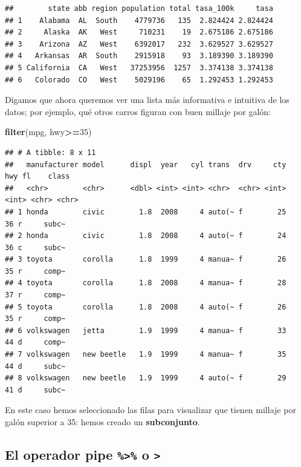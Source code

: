 \documentclass[
]{article}
\newenvironment{Shaded}{\begin{snugshade}}{\end{snugshade}}
\newcommand{\DecValTok}[1]{\textcolor[rgb]{0.00,0.00,0.81}{#1}}
\newcommand{\FunctionTok}[1]{\textcolor[rgb]{0.13,0.29,0.53}{\textbf{#1}}}
\newcommand{\NormalTok}[1]{#1}
\newcommand{\SpecialCharTok}[1]{\textcolor[rgb]{0.81,0.36,0.00}{\textbf{#1}}}
\begin{document}
\begin{verbatim}
##        state abb region population total tasa_100k     tasa
## 1    Alabama  AL  South    4779736   135  2.824424 2.824424
## 2     Alaska  AK   West     710231    19  2.675186 2.675186
## 3    Arizona  AZ   West    6392017   232  3.629527 3.629527
## 4   Arkansas  AR  South    2915918    93  3.189390 3.189390
## 5 California  CA   West   37253956  1257  3.374138 3.374138
## 6   Colorado  CO   West    5029196    65  1.292453 1.292453
\end{verbatim}

Digamos que ahora queremos ver una lista más informativa e intuitiva de
los datos; por ejemplo, qué otros carros figuran con buen millaje por
galón:

\begin{Shaded}
\begin{Highlighting}[]
\FunctionTok{filter}\NormalTok{(mpg, hwy}\SpecialCharTok{\textgreater{}=}\DecValTok{35}\NormalTok{) }
\end{Highlighting}
\end{Shaded}

\begin{verbatim}
## # A tibble: 8 x 11
##   manufacturer model      displ  year   cyl trans  drv     cty   hwy fl    class
##   <chr>        <chr>      <dbl> <int> <int> <chr>  <chr> <int> <int> <chr> <chr>
## 1 honda        civic        1.8  2008     4 auto(~ f        25    36 r     subc~
## 2 honda        civic        1.8  2008     4 auto(~ f        24    36 c     subc~
## 3 toyota       corolla      1.8  1999     4 manua~ f        26    35 r     comp~
## 4 toyota       corolla      1.8  2008     4 manua~ f        28    37 r     comp~
## 5 toyota       corolla      1.8  2008     4 auto(~ f        26    35 r     comp~
## 6 volkswagen   jetta        1.9  1999     4 manua~ f        33    44 d     comp~
## 7 volkswagen   new beetle   1.9  1999     4 manua~ f        35    44 d     subc~
## 8 volkswagen   new beetle   1.9  1999     4 auto(~ f        29    41 d     subc~
\end{verbatim}

En este caso hemos seleccionado las filas para visualizar que tienen
millaje por galón superior a 35: hemos creado un \textbf{subconjunto}.

\subsection{\texorpdfstring{El operador pipe \texttt{\%\textgreater{}\%}
o
\texttt{\textbar{}\textgreater{}}}{El operador pipe \%\textgreater\% o \textbar\textgreater{}}}\label{el-operador-pipe-o}
\end{document}
